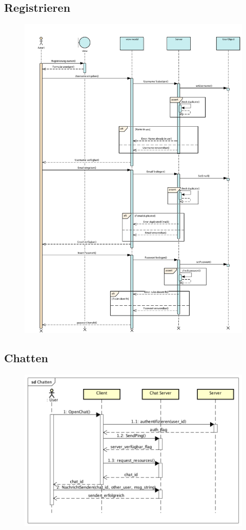 \subsection*{Registrieren}
\begin{figure}[h!]
	\centering
	\includegraphics[width=0.8\linewidth]{docs/6_Sequenzdiagramme/Markus/Registrieren.pdf}
	\label{fig:SeqDia_Registrieren}
\end{figure}

\vfill
\pagebreak

\subsection*{Chatten}
\begin{figure}[h!]
	\centering
	\includegraphics[width = 0.8\linewidth]{docs/6_Sequenzdiagramme/Patrick/Chatten.png}
	\label{fig:SeqDia_Chatten}
\end{figure}
